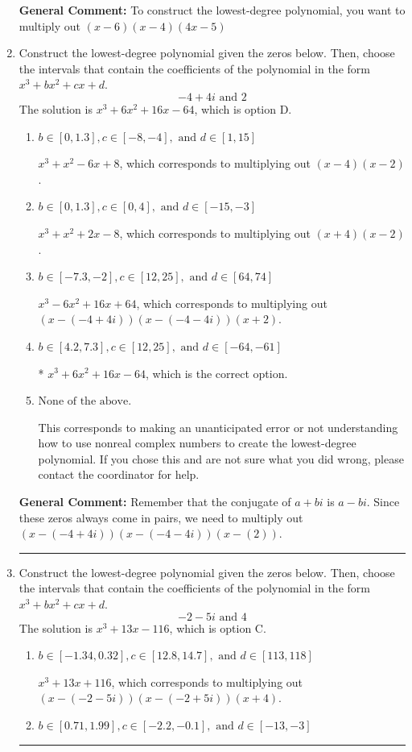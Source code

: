 \documentclass{extbook}[14pt]
\newcommand{\litem}[1]{\item #1

\rule{\textwidth}{0.4pt}}
\begin{document}
\begin{enumerate}
{\textbf{General Comment:} To construct the lowest-degree polynomial, you want to multiply out $(x -6)(x -4)(4x -5)$
}
\litem{
Construct the lowest-degree polynomial given the zeros below. Then, choose the intervals that contain the coefficients of the polynomial in the form $x^3+bx^2+cx+d$.
\[ -4 + 4 i \text{ and } 2 \]
The solution is \( x^{3} +6 x^{2} +16 x -64 \), which is option D.\begin{enumerate}[label=\Alph*.]
\item \( b \in [0, 1.3], c \in [-8, -4], \text{ and } d \in [1, 15] \)

$x^{3} + x^{2} -6 x + 8$, which corresponds to multiplying out $(x -4)(x -2)$.
\item \( b \in [0, 1.3], c \in [0, 4], \text{ and } d \in [-15, -3] \)

$x^{3} + x^{2} +2 x -8$, which corresponds to multiplying out $(x + 4)(x -2)$.
\item \( b \in [-7.3, -2], c \in [12, 25], \text{ and } d \in [64, 74] \)

$x^{3} -6 x^{2} +16 x + 64$, which corresponds to multiplying out $(x-(-4 + 4 i))(x-(-4 - 4 i))(x + 2)$.
\item \( b \in [4.2, 7.3], c \in [12, 25], \text{ and } d \in [-64, -61] \)

* $x^{3} +6 x^{2} +16 x -64$, which is the correct option.
\item \( \text{None of the above.} \)

This corresponds to making an unanticipated error or not understanding how to use nonreal complex numbers to create the lowest-degree polynomial. If you chose this and are not sure what you did wrong, please contact the coordinator for help.
\end{enumerate}

\textbf{General Comment:} Remember that the conjugate of $a+bi$ is $a-bi$. Since these zeros always come in pairs, we need to multiply out $(x-(-4 + 4 i))(x-(-4 - 4 i))(x-(2))$.
}
\litem{
Construct the lowest-degree polynomial given the zeros below. Then, choose the intervals that contain the coefficients of the polynomial in the form $x^3+bx^2+cx+d$.
\[ -2 - 5 i \text{ and } 4 \]
The solution is \( x^{3} +13 x -116 \), which is option C.\begin{enumerate}[label=\Alph*.]
\item \( b \in [-1.34, 0.32], c \in [12.8, 14.7], \text{ and } d \in [113, 118] \)

$x^{3} +13 x + 116$, which corresponds to multiplying out $(x-(-2 - 5 i))(x-(-2 + 5 i))(x + 4)$.
\item \( b \in [0.71, 1.99], c \in [-2.2, -0.1], \text{ and } d \in [-13, -3] \)


\end{enumerate}}
\end{enumerate}
\end{document}
